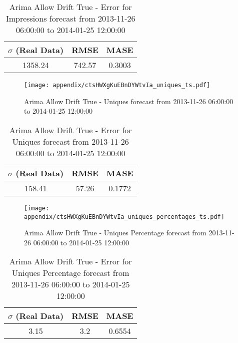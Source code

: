 \begin{table}[H]
\centering
\footnotesize
\begin{tabular}{ccc}
$\sigma$ (Real Data) & RMSE & MASE   \\ \hline
1358.24 & 742.57 & 0.3003 \\
\end{tabular}

\vspace{0.5cm}

\caption{
Arima Allow Drift True - Error for Impressions forecast from 2013-11-26 06:00:00 to 2014-01-25 12:00:00}
\end{table}

\begin{figure}[H] \begin{center} \leavevmode
\texttt{[image: appendix/ctsHWXgKuEBnDYWtvIa\_uniques\_ts.pdf]} \caption{
Arima Allow Drift True - Uniques forecast from 2013-11-26 06:00:00 to 2014-01-25 12:00:00} \label{fig:appendix/ctsHWXgKuEBnDYWtvIa_uniques_ts.pdf} \end{center}
\end{figure}

\begin{table}[H]
\centering
\footnotesize
\begin{tabular}{ccc}
$\sigma$ (Real Data) & RMSE & MASE   \\ \hline
158.41 & 57.26 & 0.1772 \\
\end{tabular}

\vspace{0.5cm}

\caption{
Arima Allow Drift True - Error for Uniques forecast from 2013-11-26 06:00:00 to 2014-01-25 12:00:00}
\end{table}

\begin{figure}[H] \begin{center} \leavevmode
\texttt{[image: appendix/ctsHWXgKuEBnDYWtvIa\_uniques\_percentages\_ts.pdf]} \caption{
Arima Allow Drift True - Uniques Percentage forecast from 2013-11-26 06:00:00 to 2014-01-25 12:00:00} \label{fig:appendix/ctsHWXgKuEBnDYWtvIa_uniques_percentages_ts.pdf} \end{center}
\end{figure}

\begin{table}[H]
\centering
\footnotesize
\begin{tabular}{ccc}
$\sigma$ (Real Data) & RMSE & MASE   \\ \hline
3.15 & 3.2 & 0.6554 \\
\end{tabular}

\vspace{0.5cm}

\caption{
Arima Allow Drift True - Error for Uniques Percentage forecast from 2013-11-26 06:00:00 to 2014-01-25 12:00:00}
\end{table}

